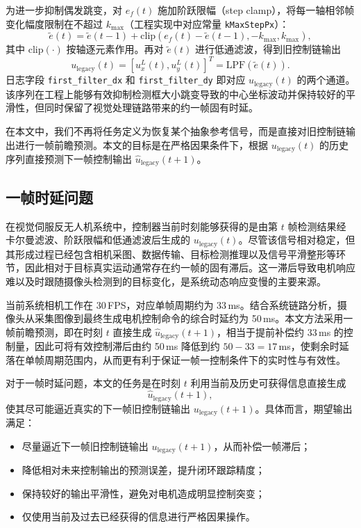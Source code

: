 \documentclass[journal]{IEEEtran}
\begin{document}
为进一步抑制偶发跳变，对 $e_f(t)$ 施加阶跃限幅（step clamp），将每一轴相邻帧变化幅度限制在不超过 $k_{\max}$（工程实现中对应常量 \texttt{kMaxStepPx}）：
\begin{equation}
\tilde{e}(t)=\tilde{e}(t-1)+\mathrm{clip}\!\left(e_f(t)-\tilde{e}(t-1),-k_{\max},k_{\max}\right),
\end{equation}
其中 $\mathrm{clip}(\cdot)$ 按轴逐元素作用。再对 $\tilde{e}(t)$ 进行低通滤波，得到旧控制链输出
\begin{equation}
u_{\mathrm{legacy}}(t)=[u_x^{L}(t),u_y^{L}(t)]^T=\mathrm{LPF}(\tilde{e}(t)).
\end{equation}
日志字段 \texttt{first\_filter\_dx} 和 \texttt{first\_filter\_dy} 即对应 $u_{\mathrm{legacy}}(t)$ 的两个通道。该序列在工程上能够有效抑制检测框大小跳变导致的中心坐标波动并保持较好的平滑性，但同时保留了视觉处理链路带来的约一帧固有时延。

在本文中，我们不再将任务定义为恢复某个抽象参考信号，而是直接对旧控制链输出进行一帧前瞻预测。本文的目标是在严格因果条件下，根据 $u_{\mathrm{legacy}}(t)$ 的历史序列直接预测下一帧控制输出 $\hat{u}_{\mathrm{legacy}}(t+1)$。

\subsection{一帧时延问题}
在视觉伺服反无人机系统中，控制器当前时刻能够获得的是由第 $t$ 帧检测结果经卡尔曼滤波、阶跃限幅和低通滤波后生成的 $u_{\mathrm{legacy}}(t)$。尽管该信号相对稳定，但其形成过程已经包含相机采图、数据传输、目标检测推理以及信号平滑整形等环节，因此相对于目标真实运动通常存在约一帧的固有滞后。这一滞后导致电机响应难以及时跟随摄像头检测到的目标变化，是系统动态响应变慢的主要来源。

当前系统相机工作在 30\,FPS，对应单帧周期约为 33\,ms。结合系统链路分析，摄像头从采集图像到最终生成电机控制命令的综合时延约为 50\,ms。本文方法采用一帧前瞻预测，即在时刻 $t$ 直接生成 $\hat{u}_{\mathrm{legacy}}(t+1)$，相当于提前补偿约 33\,ms 的控制量，因此可将有效控制滞后由约 50\,ms 降低到约 $50-33=17$\,ms，使剩余时延落在单帧周期范围内，从而更有利于保证一帧一控制条件下的实时性与有效性。

对于一帧时延问题，本文的任务是在时刻 $t$ 利用当前及历史可获得信息直接生成
\begin{equation}
\hat{u}_{\mathrm{legacy}}(t+1),
\end{equation}
使其尽可能逼近真实的下一帧旧控制链输出 $u_{\mathrm{legacy}}(t+1)$。具体而言，期望输出满足：
\begin{itemize}
\item 尽量逼近下一帧旧控制链输出 $u_{\mathrm{legacy}}(t+1)$，从而补偿一帧滞后；
\item 降低相对未来控制输出的预测误差，提升闭环跟踪精度；
\item 保持较好的输出平滑性，避免对电机造成明显控制突变；
\item 仅使用当前及过去已经获得的信息进行严格因果操作。
\end{itemize}
\end{document}
